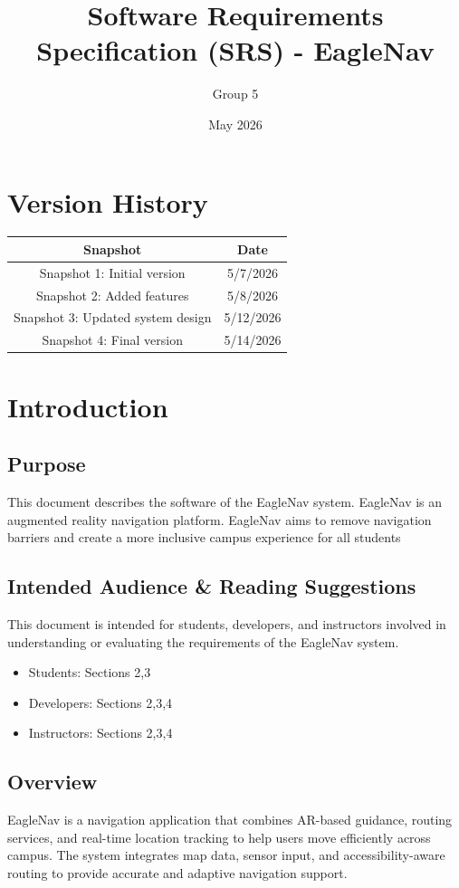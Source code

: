 \documentclass{article}
\title{Software Requirements Specification (SRS) - EagleNav}
\author{Group 5}
\date{May 2026}
\begin{document}
\maketitle
\clearpage

\tableofcontents
\newpage

\section{Version History}
\begin{table}[h!]
	\centering
	\begin{tabular}{|c|c|}
		\hline
		\textbf{Snapshot} & \textbf{Date} \\
		\hline
		Snapshot 1: Initial version & 5/7/2026 \\
		Snapshot 2: Added features & 5/8/2026 \\
		Snapshot 3: Updated system design & 5/12/2026 \\
		Snapshot 4: Final version & 5/14/2026 \\
		\hline
	\end{tabular}
\end{table}

\section{Introduction}
\subsection{Purpose}
This document describes the software of the EagleNav system.
EagleNav is an augmented reality navigation platform. EagleNav aims to remove navigation barriers and create a more inclusive campus experience for all students 

\subsection{Intended Audience \& Reading Suggestions}
This document is intended for students, developers, and instructors involved in understanding or evaluating the requirements of the EagleNav system.
\begin{itemize}
	\item Students: Sections 2,3
	\item Developers: Sections 2,3,4
	\item Instructors: Sections 2,3,4
\end{itemize}


\subsection{Overview}
EagleNav is a navigation application that combines AR-based guidance, routing services, and real-time location tracking to help users move efficiently across campus. The system integrates map data, sensor input, and accessibility-aware 
routing to provide accurate and adaptive navigation support.
\end{document}
